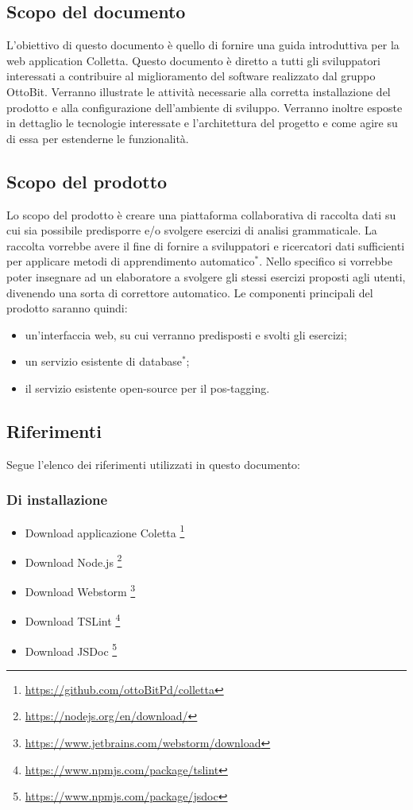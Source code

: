 \subsection{Scopo del documento}
L'obiettivo di questo documento è quello di fornire una guida introduttiva per la web application Colletta. Questo documento è  diretto a tutti gli sviluppatori interessati a contribuire al miglioramento del software realizzato dal gruppo OttoBit. Verranno illustrate le attività necessarie alla corretta installazione del prodotto e alla configurazione dell'ambiente di sviluppo. Verranno inoltre esposte in dettaglio le tecnologie interessate e l'architettura del progetto e come agire su di essa per estenderne le funzionalità.
\subsection{Scopo del prodotto}
Lo scopo del prodotto è creare una piattaforma collaborativa di raccolta dati su cui sia possibile predisporre e/o svolgere esercizi di analisi grammaticale. La raccolta vorrebbe avere il fine di fornire a sviluppatori e ricercatori dati sufficienti per applicare metodi di apprendimento automatico$^*$. Nello specifico si vorrebbe poter insegnare ad un elaboratore a svolgere gli stessi esercizi proposti agli utenti, divenendo una sorta di correttore automatico.  
Le componenti principali del prodotto saranno quindi:
\begin{itemize}
	\item un'interfaccia web, su cui verranno predisposti e svolti gli esercizi;
	\item un servizio esistente di database$^*$;
	\item il servizio esistente open-source per il pos-tagging.
\end{itemize}
\subsection{Riferimenti}
Segue l'elenco dei riferimenti utilizzati in questo documento:
\subsubsection{Di installazione}
	\begin{itemize}
	\item Download applicazione Coletta
	\footnote{\url {https://github.com/ottoBitPd/colletta}}
	\item Download Node.js
	\footnote{\url {https://nodejs.org/en/download/}}
	\item Download Webstorm
	\footnote{\url {https://www.jetbrains.com/webstorm/download}}
	\item Download TSLint
	\footnote{\url {https://www.npmjs.com/package/tslint}}
	\item Download JSDoc
	\footnote{\url {https://www.npmjs.com/package/jsdoc}}
	
\end{itemize}
